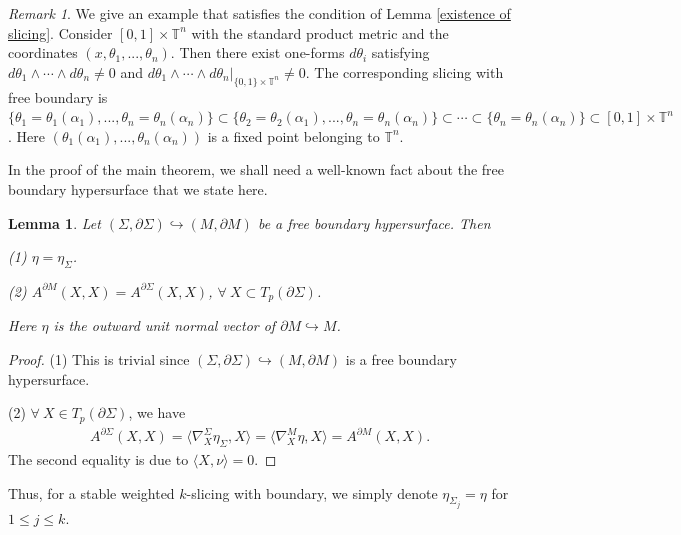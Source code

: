 \documentclass[11pt,letterpaper]{amsart}
\newtheorem{lemma}[theorem]{Lemma}
\theoremstyle{definition}
\theoremstyle{remark}
\newtheorem{remark}[theorem]{Remark}
\numberwithin{equation}{section}
\begin{document}
\begin{remark}
    We give an example that satisfies the condition of Lemma \ref{existence of slicing}. Consider $[0,1]\times \mathbb{T}^{n}$ with the standard product metric and the coordinates $(x,\theta_{1},...,\theta_{n})$. Then there exist one-forms $d \theta_{i}$ satisfying $d\theta_{1}\wedge\cdots\wedge d\theta_{n} \neq 0$ and $d\theta_{1}\wedge\cdots\wedge d\theta_{n}|_{\{0,1\}\times \mathbb{T}^{n}}\neq 0$. The corresponding slicing with free boundary is $\{\theta_{1}=\theta_{1}(\alpha_{1}),...,\theta_{n}=\theta_{n}(\alpha_{n})\}\subset\{\theta_{2}=\theta_{2}(\alpha_{1}),...,\theta_{n}=\theta_{n}(\alpha_{n})\}\subset\cdots\subset \{\theta_{n}=\theta_{n}(\alpha_{n})\}\subset [0,1]\times\mathbb{T}^{n}$. Here $(\theta_{1}(\alpha_{1}),...,\theta_{n}(\alpha_{n}))$ is a fixed point belonging to $\mathbb{T}^{n}$.
\end{remark} 

In the proof of the main theorem, we shall need a well-known fact about the free boundary hypersurface that we state here.
\begin{lemma}\label{boundary}
    Let $(\Sigma,\partial \Sigma)\hookrightarrow (M,\partial M)$ be a free boundary hypersurface. Then
    
    (1) $\eta=\eta_{\Sigma}$.
    
    (2) $A^{\partial M}(X,X)=A^{\partial \Sigma}(X,X)$, $\forall\ X\subset T_{p}(\partial \Sigma)$.  
    
\noindent Here $\eta$ is the outward unit normal vector of $\partial M\hookrightarrow M$.
\end{lemma}

\begin{proof}
    (1) This is trivial since $(\Sigma,\partial \Sigma)\hookrightarrow (M,\partial M)$ is a free boundary hypersurface.

    (2) $\forall\ X\in T_{p}(\partial \Sigma)$, we have
    \[
    \begin{aligned}
        A^{\partial \Sigma}(X,X)
        =\langle \nabla_{X}^{\Sigma}\eta_\Sigma,X\rangle
        =\langle \nabla_{X}^{M}\eta,X\rangle
        =A^{\partial M}(X,X).
    \end{aligned}
    \]
    The second equality is due to $\langle X,\nu\rangle =0$.
\end{proof}
Thus, for a stable weighted $k$-slicing with boundary, we simply denote $\eta_{\Sigma_{j}}=\eta$ for $ 1\leq j\leq k.$
\end{document}
